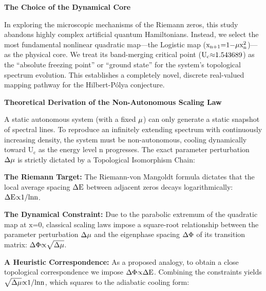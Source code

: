 \documentclass[fractalfract,article,submit,oneauthor,pdftex]{Definitions/mdpi}
\begin{document}
\textbf{The Choice of the Dynamical Core}

In exploring the microscopic mechanisms of the Riemann zeros, this study
abandons highly complex artificial quantum Hamiltonians. Instead, we
select the most fundamental nonlinear quadratic map---the Logistic map
(\(\text{x}_{\text{n}\text{+1}}\text{=1\ensuremath{-}}\text{\ensuremath{\mu}}\text{x}_{\text{n}}^{\text{2}}\))---as
the physical core. We treat its band-merging critical point
(\(\text{U}_{\text{c}}\text{\ensuremath{\approx}1.543689}\)) as the ``absolute freezing
point'' or ``ground state'' for the system's topological spectrum
evolution. This establishes a completely novel, discrete real-valued
mapping pathway for the Hilbert-P\'olya conjecture.

\textbf{Theoretical Derivation of the Non-Autonomous Scaling Law}

A static autonomous system (with a fixed \(\text{\ensuremath{\mu}}\)) can only generate
a static snapshot of spectral lines. To reproduce an infinitely
extending spectrum with continuously increasing density, the system must
be non-autonomous, cooling dynamically toward \(\text{U}_{\text{c}}\) as
the energy level \(\text{n}\) progresses. The exact parameter
perturbation \(\text{\ensuremath{\Delta}}\text{\ensuremath{\mu}}\) is strictly dictated by a Topological
Isomorphism Chain:

\textbf{The Riemann Target:} The Riemann-von Mangoldt formula dictates
that the local average spacing \(\text{\ensuremath{\Delta}}\text{E}\) between adjacent
zeros decays logarithmically: \(\text{\ensuremath{\Delta}}\text{E}\text{\ensuremath{\propto}1/ln}\text{n}\).

\textbf{The Dynamical Constraint:} Due to the parabolic extremum of the
quadratic map at \(\text{x}\text{=0}\), classical scaling laws impose a
square-root relationship between the parameter perturbation
\(\text{\ensuremath{\Delta}}\text{\ensuremath{\mu}}\) and the eigenphase spacing \(\text{\ensuremath{\Delta}\ensuremath{\Phi}}\) of its
transition matrix: \(\text{\ensuremath{\Delta}\ensuremath{\Phi}\ensuremath{\propto}}\sqrt{\text{\ensuremath{\Delta}}\text{\ensuremath{\mu}}}\).

\textbf{A Heuristic Correspondence:} As a proposed analogy, to obtain a
close topological correspondence we impose \(\text{\ensuremath{\Delta}\ensuremath{\Phi}\ensuremath{\propto}\ensuremath{\Delta}}\text{E}\).
Combining the constraints yields \(\sqrt{\text{\ensuremath{\Delta}}\text{\ensuremath{\mu}}}\text{\ensuremath{\propto}1/ln}\text{n}\),
which squares to the adiabatic cooling form:
\end{document}
